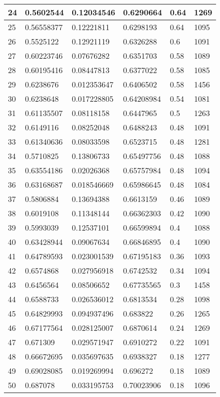 \begin{longtable}{|l|l|l|l|l|l|}
24 & 0.5602544 & 0.12034546 & 0.6290664 & 0.64 & 1269 \\ \hline 
25 & 0.56558377 & 0.12221811 & 0.6298193 & 0.64 & 1095 \\ \hline 
26 & 0.5525122 & 0.12921119 & 0.6326288 & 0.6 & 1091 \\ \hline 
27 & 0.60223746 & 0.07676282 & 0.6351703 & 0.58 & 1089 \\ \hline 
28 & 0.60195416 & 0.08447813 & 0.6377022 & 0.58 & 1085 \\ \hline 
29 & 0.6238676 & 0.012353647 & 0.6406502 & 0.58 & 1456 \\ \hline 
30 & 0.6238648 & 0.017228805 & 0.64208984 & 0.54 & 1081 \\ \hline 
31 & 0.61135507 & 0.08118158 & 0.6447965 & 0.5 & 1263 \\ \hline 
32 & 0.6149116 & 0.08252048 & 0.6488243 & 0.48 & 1091 \\ \hline 
33 & 0.61340636 & 0.08033598 & 0.6523715 & 0.48 & 1281 \\ \hline 
34 & 0.5710825 & 0.13806733 & 0.65497756 & 0.48 & 1088 \\ \hline 
35 & 0.63554186 & 0.02026368 & 0.65757984 & 0.48 & 1094 \\ \hline 
36 & 0.63168687 & 0.018546669 & 0.65986645 & 0.48 & 1084 \\ \hline 
37 & 0.5806884 & 0.13694388 & 0.6613159 & 0.46 & 1089 \\ \hline 
38 & 0.6019108 & 0.11348144 & 0.66362303 & 0.42 & 1090 \\ \hline 
39 & 0.5993039 & 0.12537101 & 0.66599894 & 0.4 & 1088 \\ \hline 
40 & 0.63428944 & 0.09067634 & 0.66846895 & 0.4 & 1090 \\ \hline 
41 & 0.64789593 & 0.023001539 & 0.67195183 & 0.36 & 1093 \\ \hline 
42 & 0.6574868 & 0.027956918 & 0.6742532 & 0.34 & 1094 \\ \hline 
43 & 0.6456564 & 0.08506652 & 0.67735565 & 0.3 & 1458 \\ \hline 
44 & 0.6588733 & 0.026536012 & 0.6813534 & 0.28 & 1098 \\ \hline 
45 & 0.64829993 & 0.094937496 & 0.683822 & 0.26 & 1265 \\ \hline 
46 & 0.67177564 & 0.028125007 & 0.6870614 & 0.24 & 1269 \\ \hline 
47 & 0.671309 & 0.029571947 & 0.6910272 & 0.22 & 1091 \\ \hline 
48 & 0.66672695 & 0.035697635 & 0.6938327 & 0.18 & 1277 \\ \hline 
49 & 0.69028085 & 0.019269994 & 0.696272 & 0.18 & 1089 \\ \hline 
50 & 0.687078 & 0.033195753 & 0.70023906 & 0.18 & 1096 \\ \hline 
\end{longtable}